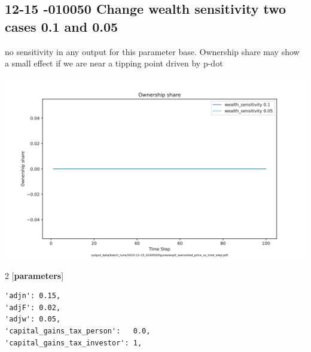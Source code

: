 \documentclass{article}
\begin{document}




\subsection{12-15 -010050 Change wealth sensitivity two cases 0.1 and 0.05 }
no sensitivity in any output for this parameter base. Ownership share may show  a small effect if we are near a tipping point driven by p-dot

\includegraphics[scale=.45]{fig/Analysis/exp0_warranted_price_vs_time_step.png}


\begin{multicols}{2}
[\textbf{parameters}]
\begin{verbatim}
'adjn': 0.15,
'adjF': 0.02,
'adjw': 0.05, 
'capital_gains_tax_person':   0.0,
'capital_gains_tax_investor': 1,
\end{verbatim}

\end{multicols}





 
\end{document}

